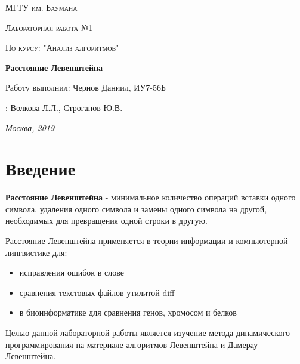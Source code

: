 \documentclass[12pt]{report}
\begin{document}
\begin{titlepage}
	\centering
	{\scshape\LARGE МГТУ им. Баумана \par}
	\vspace{3cm}
	{\scshape\Large Лабораторная работа №1\par}
	\vspace{0.5cm}	
	{\scshape\Large По курсу: "Анализ алгоритмов"\par}
	\vspace{1.5cm}
	{\huge\bfseries Расстояние Левенштейна\par}
	\vspace{2cm}
	\Large Работу выполнил: Чернов Даниил, ИУ7-56Б\par
	\vspace{0.5cm}
	:  Волкова Л.Л., Строганов Ю.В.\par

	\vfill
	\large \textit {Москва, 2019} \par
\end{titlepage}

\tableofcontents

\newpage
\chapter*{Введение}
\textbf{Расстояние Левенштейна} - минимальное количество операций вставки одного символа, удаления одного символа и замены одного символа на другой, необходимых для превращения одной строки в другую.

Расстояние Левенштейна применяется в теории информации и компьютерной лингвистике для:

\begin{itemize}
	\item исправления ошибок в слове
	\item сравнения текстовых файлов утилитой diff
	\item в биоинформатике для сравнения генов, хромосом и белков
\end{itemize}

Целью данной лабораторной работы является изучение метода динамического программирования на материале алгоритмов
Левенштейна и Дамерау-Левенштейна. 
\end{document}
